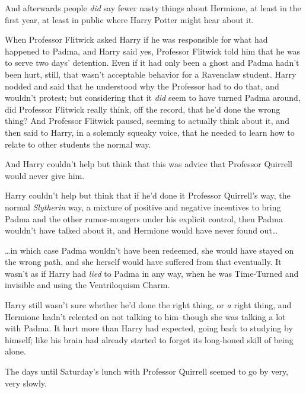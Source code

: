 And afterwards people \emph{did} say fewer nasty things about Hermione, at least in the first year, at least in public where Harry Potter might hear about it.

When Professor Flitwick asked Harry if he was responsible for what had happened to Padma, and Harry said yes, Professor Flitwick told him that he was to serve two days' detention. Even if it had only been a ghost and Padma hadn't been hurt, still, that wasn't acceptable behavior for a Ravenclaw student. Harry nodded and said that he understood why the Professor had to do that, and wouldn't protest; but considering that it \emph{did} seem to have turned Padma around, did Professor Flitwick really think, off the record, that he'd done the wrong thing? And Professor Flitwick paused, seeming to actually think about it, and then said to Harry, in a solemnly squeaky voice, that he needed to learn how to relate to other students the normal way.

And Harry couldn't help but think that this was advice that Professor Quirrell would never give him.

Harry couldn't help but think that if he'd done it Professor Quirrell's way, the normal \emph{Slytherin} way, a mixture of positive and negative incentives to bring Padma and the other rumor-mongers under his explicit control, then Padma wouldn't have talked about it, and Hermione would have never found out{\ldots}

{\ldots}in which case Padma wouldn't have been redeemed, she would have stayed on the wrong path, and she herself would have suffered from that eventually. It wasn't as if Harry had \emph{lied} to Padma in any way, when he was Time-Turned and invisible and using the Ventriloquism Charm.

Harry still wasn't sure whether he'd done the right thing, or \emph{a} right thing, and Hermione hadn't relented on not talking to him\---though she was talking a lot with Padma. It hurt more than Harry had expected, going back to studying by himself; like his brain had already started to forget its long-honed skill of being alone.

The days until Saturday's lunch with Professor Quirrell seemed to go by very, very slowly.

